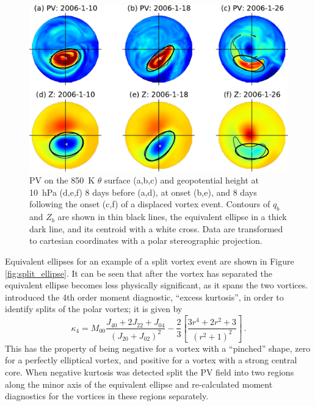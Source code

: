 \begin{figure}
 \centering
 \noindent\includegraphics[width=\textwidth]{figures/chapter-moments/PV_GPH_2006.pdf}
 \caption[Equivalent ellipse for a displaced vortex event.]{PV on the 850~K
   $\theta$ surface (a,b,c) and geopotential height at 10~hPa (d,e,f) 8 days
   before (a,d), at onset (b,e), and 8 days following the onset (c,f) of a
   displaced vortex event. Contours of $q_{b}$ and $Z_{b}$ are shown in thin
   black lines, the equivalent ellipse in a thick dark line, and its centroid
   with a white cross. Data are transformed to cartesian coordinates with a
   polar stereographic projection.}
 \label{fig:displaced_ellipse}
\end{figure}

Equivalent ellipses for an example of a split vortex event are shown in Figure
\ref{fig:split_ellipse}. It can be seen that after the vortex has separated the
equivalent ellipse becomes less physically significant, as it spans the two
vortices. \citet{Matthewman2009} introduced the 4th order moment diagnostic,
``excess kurtosis'', in order to identify splits of the polar vortex; it is
given by
\begin{equation}
\kappa_4 = M_{00}\frac{J_{40}+2J_{22}+J_{04}}{(J_{20}+J_{02})^2}-\frac{2}{3}\left[\frac{3r^4+2r^2+3}{(r^2+1)^2}\right]\,.
\end{equation}
This has the property of being negative for a vortex with a ``pinched'' shape,
zero for a perfectly elliptical vortex, and positive for a vortex with a strong
central core. When negative kurtosis was detected \citet{Matthewman2009} split
the PV field into two regions along the minor axis of the equivalent ellipse and
re-calculated moment diagnostics for the vortices in these regions separately. 

